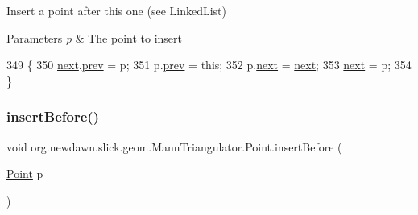 Insert a point after this one (see Linked\+List)


\begin{DoxyParams}{Parameters}
{\em p} & The point to insert \\
\hline
\end{DoxyParams}

\begin{DoxyCode}
349                                          \{
350             \mbox{\hyperlink{classorg_1_1newdawn_1_1slick_1_1geom_1_1_mann_triangulator_1_1_point_a5679974de3d6ea0e554138b1d4e19123}{next}}.\mbox{\hyperlink{classorg_1_1newdawn_1_1slick_1_1geom_1_1_mann_triangulator_1_1_point_aada0547222c51b32a918839db2eca9f2}{prev}} = p;
351             p.\mbox{\hyperlink{classorg_1_1newdawn_1_1slick_1_1geom_1_1_mann_triangulator_1_1_point_aada0547222c51b32a918839db2eca9f2}{prev}} = \textcolor{keyword}{this};
352             p.\mbox{\hyperlink{classorg_1_1newdawn_1_1slick_1_1geom_1_1_mann_triangulator_1_1_point_a5679974de3d6ea0e554138b1d4e19123}{next}} = \mbox{\hyperlink{classorg_1_1newdawn_1_1slick_1_1geom_1_1_mann_triangulator_1_1_point_a5679974de3d6ea0e554138b1d4e19123}{next}};
353             \mbox{\hyperlink{classorg_1_1newdawn_1_1slick_1_1geom_1_1_mann_triangulator_1_1_point_a5679974de3d6ea0e554138b1d4e19123}{next}} = p;
354         \}
\end{DoxyCode}
\mbox{\label{classorg_1_1newdawn_1_1slick_1_1geom_1_1_mann_triangulator_1_1_point_afd6f758bff5fb93dc7ebc2921ce9ad95}} 
\subsubsection{\texorpdfstring{insert\+Before()}{insertBefore()}}
{\footnotesize\ttfamily void org.\+newdawn.\+slick.\+geom.\+Mann\+Triangulator.\+Point.\+insert\+Before (\begin{DoxyParamCaption}\item[{\mbox{\hyperlink{classorg_1_1newdawn_1_1slick_1_1geom_1_1_mann_triangulator_1_1_point}{Point}}}]{p }\end{DoxyParamCaption})\hspace{0.3cm}{\ttfamily [inline]}}

